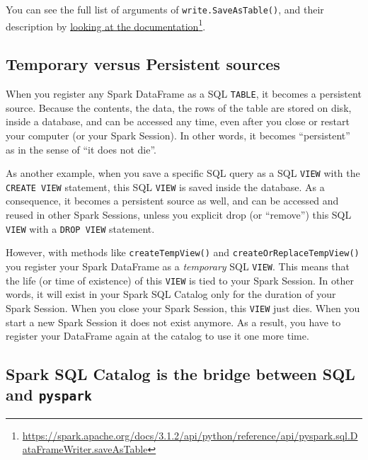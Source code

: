 \documentclass[
  11pt,
  letterpaper,
  DIV=11,
  numbers=noendperiod]{scrreprt}
\begin{document}
You can see the full list of arguments of \texttt{write.SaveAsTable()},
and their description by
\href{https://spark.apache.org/docs/3.1.2/api/python/reference/api/pyspark.sql.DataFrameWriter.saveAsTable}{looking
at the documentation}\footnote{\url{https://spark.apache.org/docs/3.1.2/api/python/reference/api/pyspark.sql.DataFrameWriter.saveAsTable}}.

\hypertarget{sec-temp-persist}{%
\subsection{Temporary versus Persistent
sources}\label{sec-temp-persist}}

When you register any Spark DataFrame as a SQL \texttt{TABLE}, it
becomes a persistent source. Because the contents, the data, the rows of
the table are stored on disk, inside a database, and can be accessed any
time, even after you close or restart your computer (or your Spark
Session). In other words, it becomes ``persistent'' as in the sense of
``it does not die''.

As another example, when you save a specific SQL query as a SQL
\texttt{VIEW} with the \texttt{CREATE\ VIEW} statement, this SQL
\texttt{VIEW} is saved inside the database. As a consequence, it becomes
a persistent source as well, and can be accessed and reused in other
Spark Sessions, unless you explicit drop (or ``remove'') this SQL
\texttt{VIEW} with a \texttt{DROP\ VIEW} statement.

However, with methods like \texttt{createTempView()} and
\texttt{createOrReplaceTempView()} you register your Spark DataFrame as
a \emph{temporary} SQL \texttt{VIEW}. This means that the life (or time
of existence) of this \texttt{VIEW} is tied to your Spark Session. In
other words, it will exist in your Spark SQL Catalog only for the
duration of your Spark Session. When you close your Spark Session, this
\texttt{VIEW} just dies. When you start a new Spark Session it does not
exist anymore. As a result, you have to register your DataFrame again at
the catalog to use it one more time.

\hypertarget{spark-sql-catalog-is-the-bridge-between-sql-and-pyspark}{%
\subsection{\texorpdfstring{Spark SQL Catalog is the bridge between SQL
and
\texttt{pyspark}}{Spark SQL Catalog is the bridge between SQL and pyspark}}\label{spark-sql-catalog-is-the-bridge-between-sql-and-pyspark}}
\end{document}
